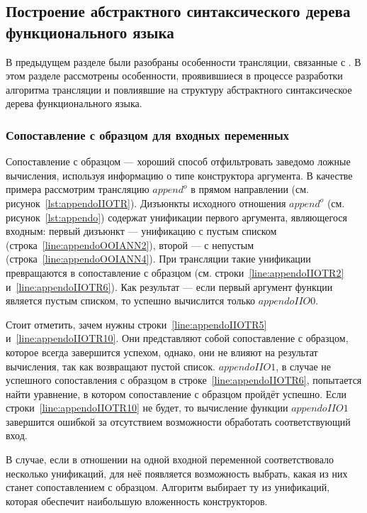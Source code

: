 \subsection{Построение абстрактного синтаксического дерева функционального языка}
\label{lab:ast}

В предыдущем разделе были разобраны особенности трансляции, связанные с \miniKanren{}.
В этом разделе рассмотрены особенности, проявившиеся в процессе разработки алгоритма трансляции и повлиявшие на структуру абстрактного синтаксическое дерева функционального языка.


\subsubsection{Сопоставление с образцом для входных переменных}

Сопоставление с образцом --- хороший способ отфильтровать заведомо ложные вычисления, используя информацию о типе конструктора аргумента.
В качестве примера рассмотрим трансляцию $append^o$ в прямом направлении (см. рисунок~\ref{lst:appendoIIOTR}).
Дизъюнкты исходного отношения $append^o$ (см. рисунок~\ref{lst:appendo}) содержат унификации первого аргумента, являющегося входным: первый дизъюнкт --- унификацию с пустым списком (строка~\ref{line:appendoOOIANN2}), второй --- с непустым (строка~\ref{line:appendoOOIANN4}).
При трансляции такие унификации превращаются в сопоставление с образцом (см. строки~\ref{line:appendoIIOTR2} и~\ref{line:appendoIIOTR6}).
Как результат --- если первый аргумент функции является пустым списком, то успешно вычислится только $appendoIIO0$.

Стоит отметить, зачем нужны строки~\ref{line:appendoIIOTR5} и~\ref{line:appendoIIOTR10}.
Они представляют собой сопоставление с образцом, которое всегда завершится успехом, однако, они не влияют на результат вычисления, так как возвращают пустой список.
$appendoIIO1$, в случае не успешного сопоставления с образцом в строке~\ref{line:appendoIIOTR6}, попытается найти уравнение, в котором сопоставление с образцом пройдёт успешно.
Если строки~\ref{line:appendoIIOTR10} не будет, то вычисление функции $appendoIIO1$ завершится ошибкой за отсутствием возможности обработать соответствующий вход.

В случае, если в отношении на \miniKanren{} одной входной переменной соответствовало несколько унификаций, для неё появляется возможность выбрать, какая из них станет сопоставлением с образцом.
Алгоритм выбирает ту из унификаций, которая обеспечит наибольшую вложенность конструкторов.


